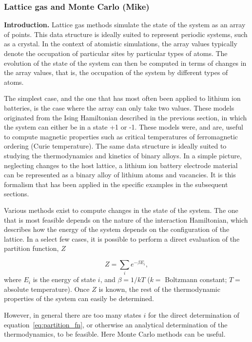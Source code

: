 \documentclass[journal=jacsat,manuscript=article]{achemso}
\begin{document}
\subsubsection{Lattice gas and Monte Carlo (Mike)}
\label{sec:monte_carlo}

\textbf{ Introduction.} Lattice gas methods simulate the state of the system as an array of points. This data structure is ideally suited to represent periodic systems, such as a crystal. In the context of atomistic simulations, the array values typically denote the occupation of particular sites by particular types of atoms. The evolution of the state of the system can then be computed in terms of changes in the array values, that is, the occupation of the system by different types of atoms.
    
The simplest case, and the one that has most often been applied to lithium ion batteries, is the case where the array can only take two values. These models originated from the Ising Hamiltonian described in the previous section, in which the system can either be in a state +1 or -1. These models were, and are, useful to compute magnetic properties such as critical temperatures of ferromagnetic ordering (Curie temperature). The same data structure is ideally suited to studying the thermodynamics and kinetics of binary alloys. In a simple picture, neglecting changes to the host lattice, a lithium ion battery electrode material can be represented as a binary alloy of lithium atoms and vacancies. It is this formalism that has been applied in the specific examples in the subsequent sections.  
    
Various methods exist to compute changes in the state of the system. The one that is most feasible depends on the nature of the interaction Hamiltonian, which describes how the energy of the system depends on the configuration of the lattice. In a select few cases, it is possible to perform a direct evaluation of the partition function, $Z$
    
\begin{equation}
        Z = \sum_{i}e^{-\beta E_{i}},
        \label{eq:partition_fn}
\end{equation}
where $E_{i}$ is the energy of state $i$, and $\beta = 1/kT$ ($k =$ Boltzmann constant; $T=$ absolute temperature). Once $Z$ is known, the rest of the thermodynamic properties of the system can easily be determined.
    
However, in general there are too many states $i$ for the direct determination of equation~\ref{eq:partition_fn}, or otherwise an analytical determination of the thermodynamics, to be feasible. Here Monte Carlo methods can be useful.
    
\end{document}

